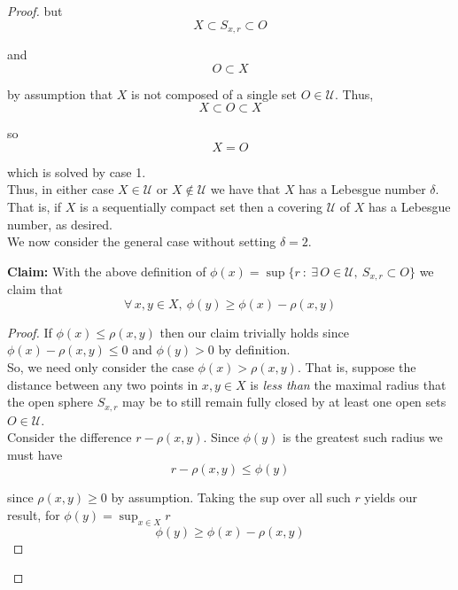 \documentclass[12pt]{article}
\newlength\tindent
\renewcommand{\indent}{\hspace*{\tindent}}
\begin{document}
\begin{proof}
but
\begin{equation*}
	X \subset S_{x,r} \subset O 
\end{equation*}

and
\begin{equation*}
	O \subset X
\end{equation*}

by assumption that $X$ is not composed of a single set $O \in \mathcal U$. Thus,
\begin{equation*}
	X \subset O \subset X
\end{equation*}

so
\begin{equation*}
	X = O
\end{equation*}

which is solved by case 1. \\

\indent Thus, in either case $X \in \mathcal U$ or $X \notin \mathcal U$ we have that $X$ has a Lebesgue number $\delta$. That is, if $X$ is a sequentially compact set then a covering $\mathcal U$ of $X$ has a Lebesgue number, as desired. \\

We now consider the general case without setting $\delta = 2$.

%
%
{\bf Claim:} With the above definition of $\phi(x) = \sup \{ r ~:~ \exists\,O\in\mathcal U,~ S_{x,r} \subset O \}$ we claim that
\begin{equation*}
	\forall\,x,y\in X,~\phi(y) \geq \phi(x) - \rho(x,y)
\end{equation*}

\begin{proof} If $\phi(x) \leq \rho(x,y)$ then our claim trivially holds since $\phi(x) - \rho(x,y) \leq 0$ and $\phi(y) > 0$ by definition. \\

\indent So, we need only consider the case $\phi(x) > \rho(x,y)$. That is, suppose the distance between any two points in $x,y \in X$ is {\em less than} the maximal radius that the open sphere $S_{x,r}$ may be to still remain fully closed by at least one open sets $O \in \mathcal U$. \\

Consider the difference $r - \rho(x,y)$. Since $\phi(y)$ is the greatest such radius we must have
\begin{equation*}
	r - \rho(x,y) \leq \phi(y)
\end{equation*}

since $\rho(x,y) \geq 0$ by assumption. Taking the sup over all such $r$ yields our result, for $\phi(y) = \sup_{x\in X} r$
\begin{equation*}
	\phi(y) \geq \phi(x) - \rho(x,y)
\end{equation*}


\end{proof}
\end{proof}
\end{document}
